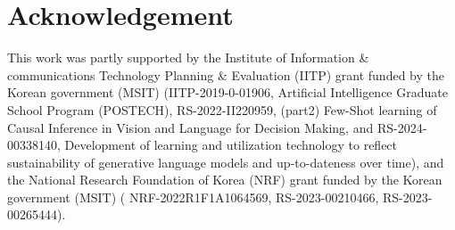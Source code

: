 \section{Acknowledgement}
This work was partly supported by the Institute of Information \& communications Technology
Planning \& Evaluation (IITP) grant funded by the Korean government (MSIT) (IITP-2019-0-01906, 
Artificial Intelligence Graduate School Program (POSTECH), RS-2022-II220959, (part2) Few-Shot learning of Causal Inference in Vision and Language for Decision Making, and RS-2024-00338140, Development of learning and utilization technology to reflect sustainability of generative language models and up-to-dateness over time), and the National Research
Foundation of Korea (NRF) grant funded by the Korean government (MSIT) (
NRF-2022R1F1A1064569, RS-2023-00210466, RS-2023-00265444).